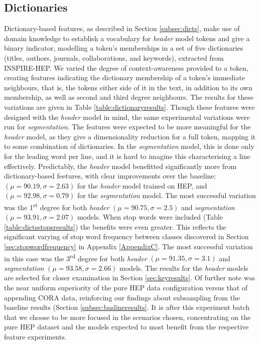 \subsection{Dictionaries}
\label{subsec:dictionaries}
Dictionary-based features, as described in Section \ref{subsec:dicts}, make use of domain knowledge to establish a vocabulary for \emph{header} model tokens and give a binary indicator, modelling a token's memberships in a set of five dictionaries (titles, authors, journals, collaborations, and keywords), extracted from INSPIRE-HEP. We varied the degree of context-awareness provided to a token, creating features indicating the dictionary membership of a token's immediate neighbours, that is, the tokens either side of it in the text, in addition to its own membership, as well as second and third degree neighbours. The results for these variations are given in Table \ref{table:dictionaryresults}. Though these features were designed with the \emph{header} model in mind, the same experimental variations were run for \emph{segmentation}. The features were expected to be more meaningful for the \emph{header} model, as they give a dimensionality reduction for a full token, mapping it to some combination of dictionaries. In the \emph{segmentation} model, this is done only for the leading word per line, and it is hard to imagine this characterising a line effectively. Predictably, the \emph{header} model benefitted significantly more from dictionary-based feetures, with clear improvements over the baseline: $(\mu =  90.19, \sigma = 2.63)$ for the \emph{header} model trained on HEP, and $(\mu =  92.98, \sigma = 0.79)$ for the \emph{segmentation} model. The most successful variation was the 1\textsuperscript{st} degree for both \emph{header} $(\mu = 90.75, \sigma = 2.5)$ and \emph{segmentation} $(\mu = 93.91, \sigma = 2.07)$ models. When stop words were included (Table \ref{table:dictsstopsresults}) the benefits were even greater. This reflects the significant varying of stop word frequency between classes discovered in Section \ref{sec:stopwordfrequency} in Appendix \ref{AppendixC}. The most successful variation in this case was the 3\textsuperscript{rd} degree for both \emph{header} $(\mu = 91.35, \sigma = 3.1)$ and \emph{segmentation} $(\mu = 93.58, \sigma = 2.66)$ models. The results for the \emph{header} models are selected for closer examination in Section \ref{sec:keyresults}. Of further note was the near uniform superiority of the pure HEP data configuration versus that of appending CORA data, reinforcing our findings about subsampling from the baseline results (Section \ref{subsec:baslineresults}. It is after this experiment batch that we choose to be more focused in the scenarios chosen, concentrating on the pure HEP dataset and the models expected to most benefit from the respective feature experiments.

